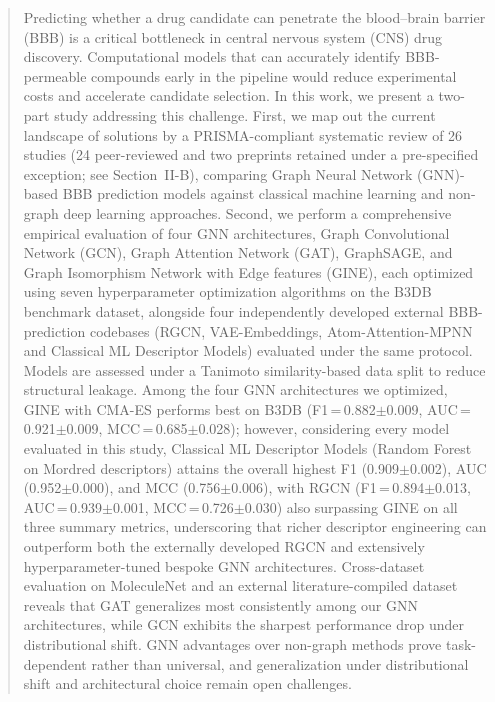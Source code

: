 \documentclass[conference]{IEEEtran}
\begin{document}
\begin{abstract}
Predicting whether a drug candidate can penetrate the blood–brain barrier
(BBB) is a critical bottleneck in central nervous system (CNS) drug
discovery. Computational models that can accurately identify BBB-permeable
compounds early in the pipeline would reduce experimental costs and accelerate candidate selection. 
In this work, we present a two-part study addressing
this challenge. First, we map out the current landscape of solutions by a PRISMA-compliant systematic review of
26 studies (24 peer-reviewed and two preprints retained under a pre-specified exception; see Section~II-B), comparing Graph Neural Network (GNN)-based BBB
prediction models against classical machine learning and non-graph deep
learning approaches. Second, we perform a comprehensive empirical
evaluation of four GNN architectures, Graph Convolutional Network (GCN),
Graph Attention Network (GAT), GraphSAGE, and Graph Isomorphism
Network with Edge features (GINE), each optimized using seven
hyperparameter optimization algorithms
on the B3DB benchmark dataset, alongside four independently developed
external BBB-prediction codebases (RGCN, VAE-Embeddings, Atom-Attention-MPNN and  Classical ML Descriptor Models) evaluated under the same protocol. Models are assessed under a Tanimoto similarity-based data split to reduce
structural leakage. Among the four GNN architectures we optimized, GINE
with CMA-ES performs best on B3DB (F1\,=\,0.882$\pm$0.009, AUC\,=\,0.921$\pm$0.009,
MCC\,=\,0.685$\pm$0.028); however, considering every model evaluated in this
study, Classical ML Descriptor Models (Random Forest on Mordred descriptors) attains the
overall highest F1 (0.909$\pm$0.002), AUC (0.952$\pm$0.000), and MCC (0.756$\pm$0.006), with RGCN
(F1\,=\,0.894$\pm$0.013, AUC\,=\,0.939$\pm$0.001, MCC\,=\,0.726$\pm$0.030) also surpassing GINE on all
three summary metrics, underscoring that richer descriptor engineering can outperform both the externally developed RGCN and extensively hyperparameter-tuned bespoke GNN architectures. Cross-dataset evaluation
on MoleculeNet and an external literature-compiled dataset reveals that
GAT generalizes most consistently among our GNN architectures, while
GCN exhibits the sharpest performance drop under distributional shift.
GNN advantages over non-graph methods prove task-dependent rather than
universal, and generalization under distributional shift and
architectural choice remain open challenges.
\end{abstract}
\end{document}
